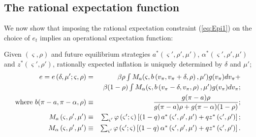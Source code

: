 \documentclass[12pt,letter,leqno]{article}
\theoremstyle{asn}
\theoremstyle{lem}
\theoremstyle{slem}
\theoremstyle{prop}
\theoremstyle{appprop}
\theoremstyle{rem}
\theoremstyle{defn}
\begin{document}
\subsection{The rational expectation function}\label{appsec:consolidate2}

We now show that imposing the rational expectation constraint (\ref{eq:Epi1}) on the choice of $e_t$ implies an operational expectation function:

\begin{slem}\label{lem:eAppApp}%
Given $\left( \varsigma ,\rho \right) $ and future equilibrium strategies $a^{\ast }\left( \varsigma' ,\rho' ,\mu' \right) $, $%
\alpha ^{\ast }\left( \varsigma' ,\rho' ,\mu' \right) $ and $z^{\ast }\left(
\varsigma' ,\rho' \right) $, rationally expected inflation is uniquely
determined by $\delta$ and $\mu'$;%
\begin{eqnarray}
e =e\left( \delta ,\mu ^{\prime };\varsigma ,\rho \right) &=&\beta \rho \textstyle\int 
M_{a}(\varsigma ,b\left( v_\pi,v_\pi +\delta ,\rho \right) ,\mu ^{\prime })g(v_\pi)
dv_\pi+  \label{app:RE} \\
&&\beta (1-\rho )\textstyle\int M_{\alpha}(\varsigma ,b\left(v_\pi -\delta ,v_\pi ,\rho \right) ,\mu ^{\prime })g(
v_\pi) dv_\pi; \notag\\
\text{where } b(\pi-a,\pi-\alpha,\rho) &\equiv&\frac{g(\pi-a)\rho}{g(\pi-a)\rho+g(\pi-\alpha)(1-\rho)}; \notag \\
M_{a}\left( \varsigma ,\rho ^{\prime },\mu ^{\prime }\right)
&\equiv&\textstyle\sum_{\varsigma ^{\prime }}\varphi \left( \varsigma ^{\prime };\varsigma
\right) \left[ \left( 1-q\right) a^{\ast }\left( \varsigma ^{\prime },\rho
^{\prime },\mu ^{\prime }\right) +qz^{\ast }\left( \varsigma ^{\prime },\rho
^{\prime }\right) \right] ;  \notag\\
M_{\alpha}\left( \varsigma ,\rho ^{\prime },\mu ^{\prime }\right)
&\equiv&\textstyle\sum_{\varsigma ^{\prime }}\varphi \left( \varsigma ^{\prime };\varsigma
\right) \left[ \left( 1-q\right) \alpha ^{\ast }\left( \varsigma ^{\prime
},\rho ^{\prime },\mu ^{\prime }\right) +qz^{\ast }\left( \varsigma ^{\prime
},\rho ^{\prime }\right) \right] .  \notag
\end{eqnarray}%

\end{slem}%
\end{document}
